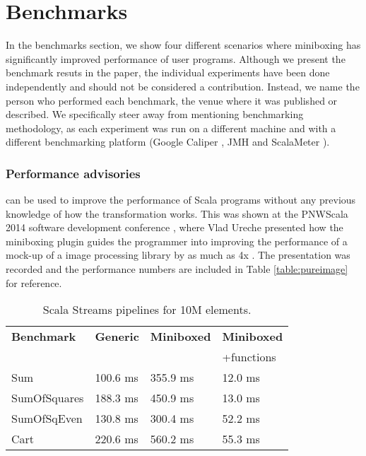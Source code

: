 

\section{Benchmarks}
\label{sec:bench}

In the benchmarks section, we show four different scenarios where miniboxing has significantly improved performance of user programs. Although we present the benchmark resuts in the paper, the individual experiments have been done independently and should not be considered a contribution. Instead, we name the person who performed each benchmark, the venue where it was published or described. We specifically steer away from mentioning benchmarking methodology, as each experiment was run on a different machine and with a different benchmarking platform (Google Caliper \cite{google-caliper}, JMH \cite{jmh} and ScalaMeter \cite{scalameter}).

\subsubsection{Performance advisories} can be used to improve the performance of Scala programs without any previous knowledge of how the transformation works. This was shown at the PNWScala 2014 software development conference \cite{pnwscala-conf}, where Vlad Ureche presented how the miniboxing plugin guides the programmer into improving the performance of a mock-up of a image processing library by as much as 4x \cite{pnwscala-pureimage}. The presentation was recorded and the performance numbers are included in Table \ref{table:pureimage} for reference.


\begin{table}[t]
  \begin{tabularx}{0.48\textwidth}{|g *{3}{|Y}|} \hline
    \textbf{Benchmark} & \textbf{Generic} & \textbf{Miniboxed}& \textbf{Miniboxed} \\
                       &                  &                   & +functions \\ \hline
    Sum              &              100.6 ms &              355.9 ms &             12.0 ms \\
    SumOfSquares     &              188.3 ms &              450.9 ms &             13.0 ms \\
    SumOfSqEven      &              130.8 ms &              300.4 ms &             52.2 ms \\
    Cart             &              220.6 ms &              560.2 ms &             55.3 ms \\ \hline
  \end{tabularx}
  \vspace{-2mm}
  \caption{Scala Streams pipelines for 10M elements.}
  \label{table:streams}
  \vspace{-1em}
\end{table}

